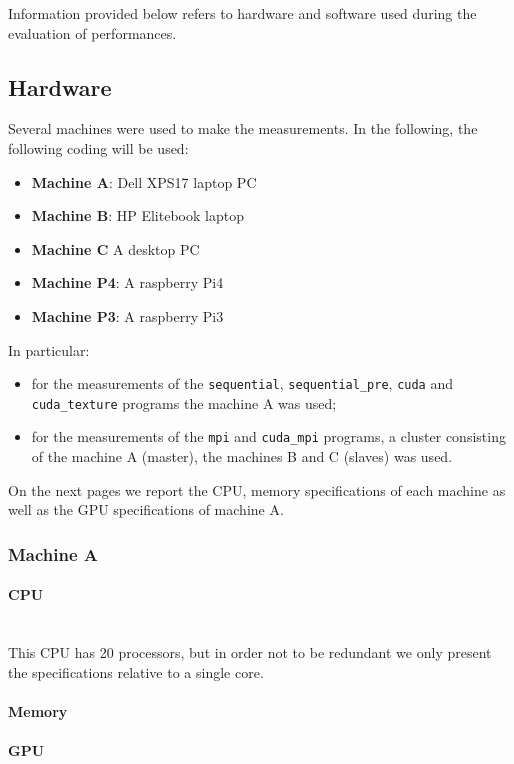 \noindent Information provided below refers to hardware and software used during the evaluation of performances.

\subsection{Hardware}
Several machines were used to make the measurements. In the following, the following coding will be used:
\begin{itemize}
  \item \textbf{Machine A}: Dell XPS17 laptop PC
  \item \textbf{Machine B}: HP Elitebook laptop
  \item \textbf{Machine C} A desktop PC
  \item \textbf{Machine P4}: A raspberry Pi4
  \item \textbf{Machine P3}: A raspberry Pi3
\end{itemize}
In particular:
\begin{itemize}
    \item for the measurements of the \verb|sequential|, \verb|sequential_pre|, \verb|cuda| and \verb|cuda_texture| programs the machine A was used;
    \item for the measurements of the \verb|mpi| and \verb|cuda_mpi| programs, a cluster consisting of the machine A (master), the machines B and C (slaves) was used.
\end{itemize}
On the next pages we report the CPU, memory specifications of each machine as well as the GPU specifications of machine A.

\subsubsection{Machine A}
\paragraph{CPU}\mbox{}\\
This CPU has 20 processors, but in order not to be redundant we only present the specifications relative to a single core.
{\fontsize{9}{10}\selectfont }
\paragraph{Memory}
{\fontsize{9}{10}\selectfont }
\paragraph{GPU}
{\fontsize{9}{10}\selectfont }
{\fontsize{9}{10}\selectfont }

